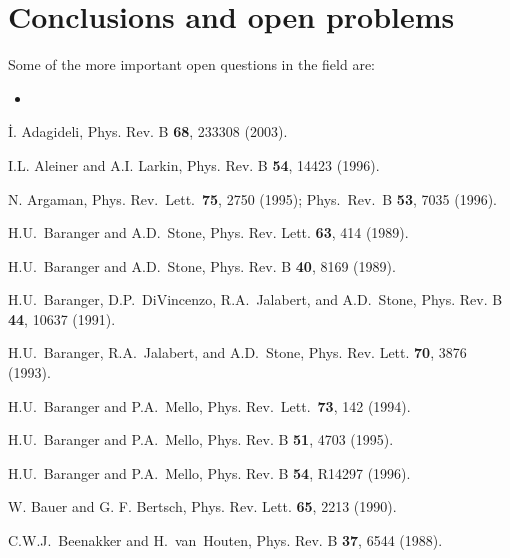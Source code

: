 \documentclass[a4paper,10pt]{article}
\begin{document}
\section{Conclusions and open problems}

Some of the more important open questions in the field are:

\begin{itemize}

\item 

\end{itemize}


\renewcommand{\refname}{References (mainly research articles)}
\begin{thebibliography}{Cucc~02b}

İ. Adagideli, Phys. Rev. B {\bf 68}, 233308 (2003).

I.L. Aleiner and A.I. Larkin, Phys. Rev. B {\bf 54}, 14423 (1996).

N. Argaman, Phys. Rev.~Lett.~{\bf 75}, 2750 (1995); Phys.\ Rev.\ B {\bf 53}, 7035 (1996).

H.U.~Baranger and A.D.~Stone, Phys. Rev. Lett. {\bf 63}, 414 (1989).

H.U.~Baranger and A.D.~Stone, Phys. Rev. B {\bf 40}, 8169 (1989).

H.U.~Baranger, D.P.~DiVincenzo, R.A.~Jalabert, and A.D.~Stone,
Phys. Rev. B {\bf 44}, 10637 (1991).

H.U.~Baranger, R.A.~Jalabert, and A.D.~Stone,
Phys. Rev. Lett. {\bf 70}, 3876 (1993).

H.U.~Baranger and  P.A.~Mello,
Phys. Rev.~Lett.~{\bf 73}, 142 (1994).

 H.U.~Baranger and P.A.~Mello,
Phys. Rev. B {\bf 51}, 4703 (1995).

H.U.~Baranger and P.A.~Mello,
Phys. Rev. B {\bf 54}, R14297 (1996).

W. Bauer and G. F. Bertsch, Phys. Rev. Lett. {\bf 65}, 2213 (1990).

C.W.J.~Beenakker and H.~van~Houten, Phys. Rev. B {\bf 37}, 6544 (1988).


\end{thebibliography}
\end{document}

